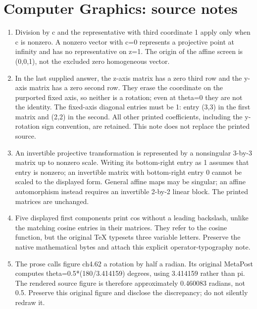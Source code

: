 \section*{Computer Graphics: source notes}
\begin{enumerate}
\item Division by c and the representative with third coordinate 1 apply only when c is nonzero. A nonzero vector with c=0 represents a projective point at infinity and has no representative on z=1. The origin of the affine screen is (0,0,1), not the excluded zero homogeneous vector.
\item In the last supplied answer, the z-axis matrix has a zero third row and the y-axis matrix has a zero second row. They erase the coordinate on the purported fixed axis, so neither is a rotation; even at theta=0 they are not the identity. The fixed-axis diagonal entries must be 1: entry (3,3) in the first matrix and (2,2) in the second. All other printed coefficients, including the y-rotation sign convention, are retained. This note does not replace the printed source.
\item An invertible projective transformation is represented by a nonsingular 3-by-3 matrix up to nonzero scale. Writing its bottom-right entry as 1 assumes that entry is nonzero; an invertible matrix with bottom-right entry 0 cannot be scaled to the displayed form. General affine maps may be singular; an affine automorphism instead requires an invertible 2-by-2 linear block. The printed matrices are unchanged.
\item Five displayed first components print cos without a leading backslash, unlike the matching cosine entries in their matrices. They refer to the cosine function, but the original TeX typesets three variable letters. Preserve the native mathematical bytes and attach this explicit operator-typography note.
\item The prose calls figure ch4.62 a rotation by half a radian. Its original MetaPost computes theta=0.5*(180/3.414159) degrees, using 3.414159 rather than pi. The rendered source figure is therefore approximately 0.460083 radians, not 0.5. Preserve this original figure and disclose the discrepancy; do not silently redraw it.
\end{enumerate}
